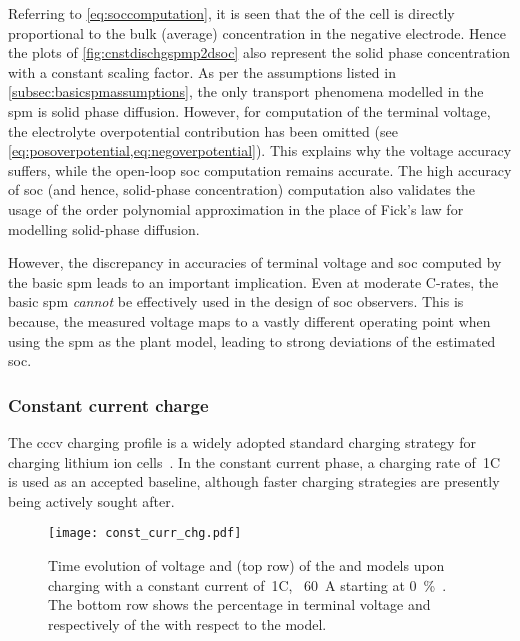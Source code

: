Referring to \cref{eq:soccomputation}, it is  seen that the  of
the cell  is directly proportional  to the  bulk (average) concentration  in the
negative  electrode.  Hence  the plots  of  \cref{fig:cnstdischgspmp2dsoc}  also
represent the solid  phase concentration with a constant scaling  factor. As per
the assumptions listed in  \cref{subsec:basicspmassumptions}, the only transport
phenomena  modelled in  the \gls{spm}  is  solid phase  diffusion. However,  for
computation of the terminal  voltage, the electrolyte overpotential contribution
has  been  omitted  (see  \cref{eq:posoverpotential,eq:negoverpotential}).  This
explains  why  the  voltage  accuracy suffers,  while  the  open-loop  \gls{soc}
computation  remains  accurate.  The  high accuracy  of  \gls{soc}  (and  hence,
solid-phase  concentration)   computation  also  validates  the   usage  of  the
 order polynomial  approximation in the place of  Fick's law for
modelling solid-phase diffusion.

However,  the  discrepancy  in  accuracies of  terminal  voltage  and  \gls{soc}
computed  by the  basic \gls{spm}  leads to  an important  implication. Even  at
moderate C-rates, the  basic \gls{spm} \emph{cannot} be effectively  used in the
design of \gls{soc}  observers. This is because, the measured  voltage maps to a
vastly different  operating point when using  the \gls{spm} as the  plant model,
leading to strong deviations of the estimated \gls{soc}.


\subsubsection*{Constant current charge}\label{subsubsec:cnstcurrchgsim}

The \gls{cccv} charging  profile is a widely adopted  standard charging strategy
for charging lithium ion cells~\cite{Andrea2010}. In the constant current phase,
a charging rate of~1C is used  as an accepted baseline, although faster charging
strategies are presently being actively sought after.


\begin{figure}[!htbp]
    \centering
    \texttt{[image: const\_curr\_chg.pdf]}
    \caption[Voltage and  computed by  and
     for 1C~constant current charge]{Time evolution of voltage
        and  (top row) of the  and
         models upon charging with a constant current of~1C,
        \ie~\SI{60}{\ampere} starting at \SI{0}{\percent}~.
        The bottom row shows the percentage in terminal voltage and
         respectively of the  with respect to
    the  model.}
    \label{fig:cnstchgspmp2d}
\end{figure}

